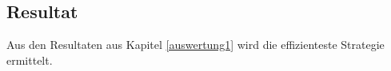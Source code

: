 \documentclass[12pt,a4paper]{scrartcl}
\begin{document}

\subsection{Resultat}
Aus den Resultaten aus Kapitel \ref{auswertung1} wird die effizienteste Strategie ermittelt. \newline
\end{document}
